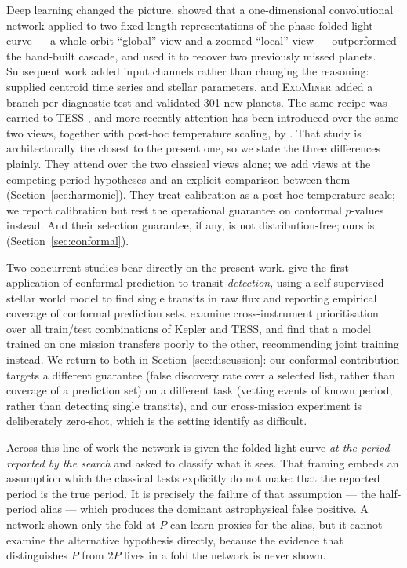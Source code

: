 \documentclass[preprint,12pt,authoryear]{elsarticle}
\newcommand{\exominer}{\textsc{ExoMiner}}
\begin{document}
Deep learning changed the picture. \citet{Shallue2018} showed that a
one-dimensional convolutional network applied to two fixed-length
representations of the phase-folded light curve --- a whole-orbit ``global''
view and a zoomed ``local'' view --- outperformed the hand-built cascade, and
used it to recover two previously missed planets. Subsequent work added input
channels rather than changing the reasoning: \citet{Ansdell2018} supplied
centroid time series and stellar parameters, and \exominer{}
\citep{Valizadegan2022} added a branch per diagnostic test and validated 301 new
planets. The same recipe was carried to TESS \citep{Yu2019, Osborn2020}, and more
        recently attention has been introduced over the same two views, together with
        post-hoc temperature scaling, by \citet{Islam2026}. That study is architecturally
        the closest to the present one, so we state the three differences plainly. They
        attend over the two classical views alone; we add views at the competing period
        hypotheses and an explicit comparison between them (Section~\ref{sec:harmonic}).
        They treat calibration as a post-hoc temperature scale; we report calibration but
        rest the operational guarantee on conformal $p$-values instead. And their
        selection guarantee, if any, is not distribution-free; ours is
        (Section~\ref{sec:conformal}).

Two concurrent studies bear directly on the present work. \citet{Priyanshu2026}
give the first application of conformal prediction to transit \emph{detection},
using a self-supervised stellar world model to find single transits in raw flux
and reporting empirical coverage of conformal prediction sets.
\citet{Kopparapu2026} examine cross-instrument prioritisation over all
train/test combinations of Kepler and TESS, and find that a model trained on one
mission transfers poorly to the other, recommending joint training instead. We
return to both in Section~\ref{sec:discussion}: our conformal contribution
targets a different guarantee (false discovery rate over a selected list, rather
than coverage of a prediction set) on a different task (vetting events of known
period, rather than detecting single transits), and our cross-mission experiment
is deliberately zero-shot, which is the setting \citet{Kopparapu2026} identify as
difficult.

Across this line of work the network is given the folded light curve
\emph{at the period reported by the search} and asked to classify what it sees.
That framing embeds an assumption which the classical tests explicitly do not
make: that the reported period is the true period. It is precisely the failure
of that assumption --- the half-period alias --- which produces the dominant
astrophysical false positive. A network shown only the fold at $P$ can learn
proxies for the alias, but it cannot examine the alternative hypothesis
directly, because the evidence that distinguishes $P$ from $2P$ lives in a fold
the network is never shown.
\end{document}
